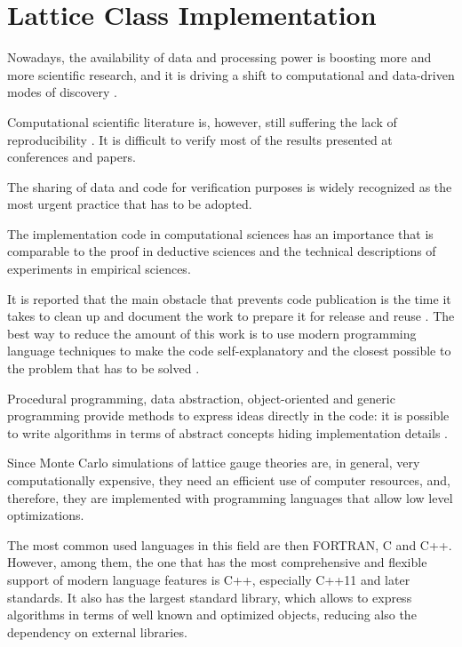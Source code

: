 \chapter{Lattice Class Implementation}\label{ch:lattice}

Nowadays, the availability of data and processing power is boosting more and more scientific research,
and it is driving a shift to computational and data-driven modes of discovery \cite{nielsen:2011}.

Computational scientific literature is, however, still suffering the lack of reproducibility \cite{reproducible:2009}.
It is difficult to verify most of the results presented at conferences and papers.

The sharing of data and code for verification purposes \cite{reproducible:2012}
is widely recognized as the most urgent practice that has to be adopted.

The implementation code in computational sciences has an importance that is comparable to the proof in deductive sciences \cite{topten}
and the technical descriptions of experiments in empirical sciences.

It is reported that the main obstacle that prevents code publication is the time it takes to clean up and document the work to prepare it for release and reuse \cite{obstacles}.
The best way to reduce the amount of this work is to use modern programming language techniques to make the code self-explanatory
and the closest possible to the problem that has to be solved \cite{best_pratices}.

Procedural programming, data abstraction, object-oriented and generic programming provide methods to express ideas directly in the code:
it is possible to write algorithms in terms of abstract concepts hiding implementation details \cite{stroustrup:2013}.

Since Monte Carlo simulations of lattice gauge theories are, in general, very computationally expensive,
they need an efficient use of computer resources, and, therefore, they are implemented with programming languages that allow low level optimizations.

The most common used languages in this field are then FORTRAN, C and C++.
However, among them, the one that has the most comprehensive and flexible support of modern language features is C++,
especially C++11 and later standards.
It also has the largest standard library,
which allows to express algorithms in terms of well known and optimized objects, 
reducing also the dependency on external libraries.

